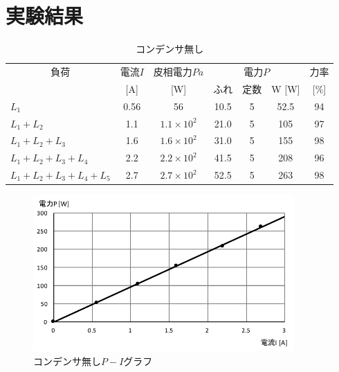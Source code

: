 \documentclass[uplatex]{jsarticle}
\begin{document}
    \section{実験結果}
        \begin{table}[h]
            \centering
            \caption{コンデンサ無し}
            \begin{tabular}{l|c|c|c|c|c|c} \hline \hline
                \multicolumn{1}{c|}{負荷}               & 電流$I$  & 皮相電力$Pa$        & \multicolumn{3}{c|}{電力$P$} & 力率 \\ \cline{4-7}
                                                        & [A]      & [W]                & ふれ & 定数 & W [W]           & [$\%$] \\ \hline
                $L_{1}$                                 & 0.56     & 56                  & 10.5 & 5 & 52.5              & 94 \\
                $L_{1} + L_{2}$                         & 1.1      & $1.1 \times 10^{2}$ & 21.0 & 5 & 105               & 97 \\
                $L_{1} + L_{2} + L_{3}$                 & 1.6      & $1.6 \times 10^{2}$ & 31.0 & 5 & 155               & 98 \\
                $L_{1} + L_{2} + L_{3}+ L_{4}$          & 2.2      & $2.2 \times 10^{2}$ & 41.5 & 5 & 208               & 96 \\
                $L_{1} + L_{2} + L_{3} + L_{4} + L_{5}$ & 2.7      & $2.7 \times 10^{2}$ & 52.5 & 5 & 263               & 98 \\ \hline
            \end{tabular}
        \end{table}
        \begin{figure}[h]
            \centering
            \includegraphics[width = 10cm]{gurahu1.pdf}
            \caption{コンデンサ無し$P-I$グラフ}
        \end{figure}
\end{document}

